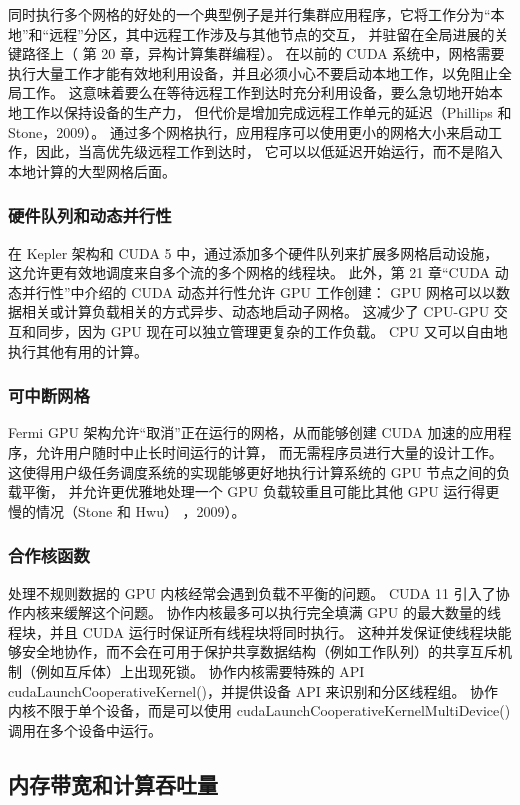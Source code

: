 同时执行多个网格的好处的一个典型例子是并行集群应用程序，它将工作分为“本地”和“远程”分区，其中远程工作涉及与其他节点的交互，
并驻留在全局进展的关键路径上（ 第 20 章，异构计算集群编程）。 
在以前的 CUDA 系统中，网格需要执行大量工作才能有效地利用设备，并且必须小心不要启动本地工作，以免阻止全局工作。 
这意味着要么在等待远程工作到达时充分利用设备，要么急切地开始本地工作以保持设备的生产力，
但代价是增加完成远程工作单元的延迟（Phillips 和 Stone，2009）。 
通过多个网格执行，应用程序可以使用更小的网格大小来启动工作，因此，当高优先级远程工作到达时，
它可以以低延迟开始运行，而不是陷入本地计算的大型网格后面。

\subsubsection{硬件队列和动态并行性}
在 Kepler 架构和 CUDA 5 中，通过添加多个硬件队列来扩展多网格启动设施，这允许更有效地调度来自多个流的多个网格的线程块。 
此外，第 21 章“CUDA 动态并行性”中介绍的 CUDA 动态并行性允许 GPU 工作创建：
GPU 网格可以以数据相关或计算负载相关的方式异步、动态地启动子网格。 
这减少了 CPU-GPU 交互和同步，因为 GPU 现在可以独立管理更复杂的工作负载。 CPU 又可以自由地执行其他有用的计算。

\subsubsection{可中断网格}
Fermi GPU 架构允许“取消”正在运行的网格，从而能够创建 CUDA 加速的应用程序，允许用户随时中止长时间运行的计算，
而无需程序员进行大量的设计工作。 这使得用户级任务调度系统的实现能够更好地执行计算系统的 GPU 节点之间的负载平衡，
并允许更优雅地处理一个 GPU 负载较重且可能比其他 GPU 运行得更慢的情况（Stone 和 Hwu） ，2009）。

\subsubsection{合作核函数}
处理不规则数据的 GPU 内核经常会遇到负载不平衡的问题。 CUDA 11 引入了协作内核来缓解这个问题。 
协作内核最多可以执行完全填满 GPU 的最大数量的线程块，并且 CUDA 运行时保证所有线程块将同时执行。 
这种并发保证使线程块能够安全地协作，而不会在可用于保护共享数据结构（例如工作队列）的共享互斥机制（例如互斥体）上出现死锁。 
协作内核需要特殊的 API cudaLaunchCooperativeKernel()，并提供设备 API 来识别和分区线程组。 
协作内核不限于单个设备，而是可以使用 cudaLaunchCooperativeKernelMultiDevice() 调用在多个设备中运行。

\subsection{内存带宽和计算吞吐量}

